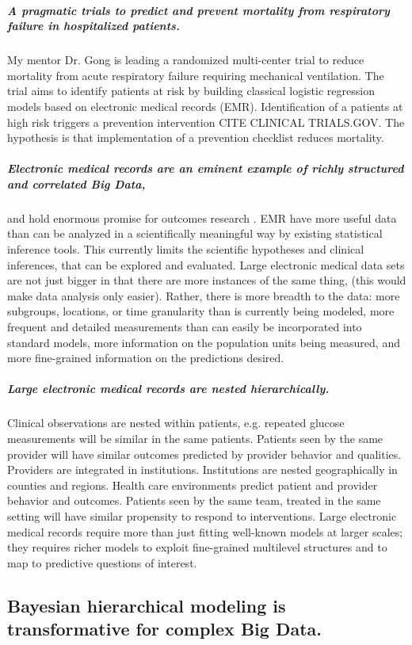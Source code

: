 \documentclass[11pt,notitlepage]{article}
\begin{document}
\subparagraph{A pragmatic trials to predict and prevent mortality from respiratory failure in hospitalized patients.} My mentor Dr. Gong is leading a randomized multi-center trial to reduce mortality from acute respiratory failure requiring mechanical ventilation. The trial aims to identify patients at risk by building classical logistic regression models based on electronic medical records (EMR). Identification of a patients at high risk triggers a prevention intervention CITE CLINICAL TRIALS.GOV. The hypothesis is that implementation of a prevention checklist reduces mortality. 

\subparagraph{Electronic medical records are an eminent example of richly structured and correlated Big Data,} 
and hold enormous promise for outcomes research \cite{Dean_19279318,Amarasingham20940649}. EMR have more useful data than can be analyzed in a scientifically meaningful way by existing statistical inference tools. This currently limits the scientific hypotheses and clinical inferences, that can be explored and evaluated. Large electronic medical data sets are not just bigger in that there are more instances of the same thing, (this would make data analysis only easier). Rather, there is more breadth to the data: more subgroups, locations, or time granularity than is currently being modeled, more frequent and detailed measurements than can easily be incorporated into standard models, more information on the population units being measured, and more fine-grained information on the predictions desired. 

\subparagraph{Large electronic medical records are nested hierarchically.}
Clinical observations are nested within patients, e.g. repeated glucose measurements will be similar in the same patients. Patients seen by the same provider will have similar outcomes predicted by provider behavior and qualities. Providers are integrated in institutions. Institutions are nested geographically in counties and regions. Health care environments predict patient and provider behavior and outcomes. Patients seen by the same team, treated in the same setting will have similar propensity to respond to interventions. Large electronic medical records require more than just fitting well-known models at larger scales; they requires richer models to exploit fine-grained multilevel structures and to map to predictive questions of interest.


\subsection*{Bayesian hierarchical modeling is transformative for complex Big Data.}
\end{document}
